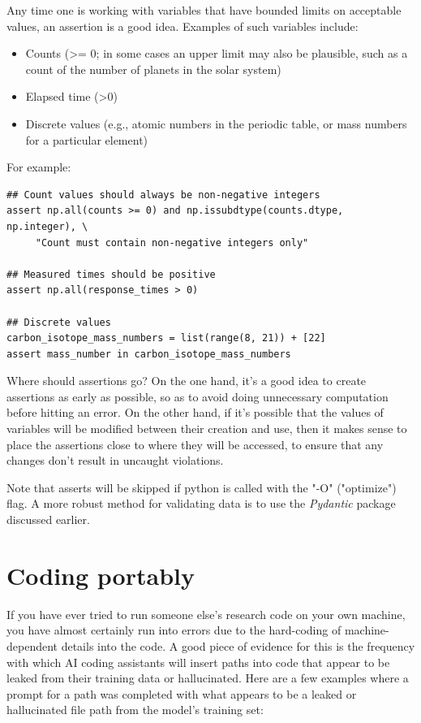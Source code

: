Any time one is working with variables that have bounded limits on acceptable values, an assertion is a good idea.
Examples of such variables include:

\begin{itemize}
\item Counts (\textgreater = 0; in some cases an upper limit may also be plausible, such as a count of the number of planets in the solar system)
\item Elapsed time (\textgreater  0)
\item Discrete values (e.g., atomic numbers in the periodic table, or mass numbers for a particular element)
\end{itemize}

For example:

\begin{lstlisting}[style=Python]
## Count values should always be non-negative integers
assert np.all(counts >= 0) and np.issubdtype(counts.dtype, np.integer), \
     "Count must contain non-negative integers only"

## Measured times should be positive
assert np.all(response_times > 0)

## Discrete values
carbon_isotope_mass_numbers = list(range(8, 21)) + [22]
assert mass_number in carbon_isotope_mass_numbers
\end{lstlisting}

Where should assertions go? On the one hand, it's a good idea to create assertions as early as possible, so as to avoid doing unnecessary computation before hitting an error.  On the other hand, if it's possible that the values of variables will be modified between their creation and use, then it makes sense to place the assertions close to where they will be accessed, to ensure that any changes don't result in uncaught violations.  

Note that asserts will be skipped if python is called with the "-O" ("optimize") flag.  A more robust method for validating data is to use the \textit{Pydantic} package discussed earlier.

\section{Coding portably}

If you have ever tried to run someone else's research code on your own machine, you have almost certainly run into errors due to the hard-coding of machine-dependent details into the code.
A good piece of evidence for this is the frequency with which AI coding assistants will insert paths into code that appear to be leaked from their training data or hallucinated.
Here are a few examples where a prompt for a path was completed with what appears to be a leaked or hallucinated file path from the model's training set:

